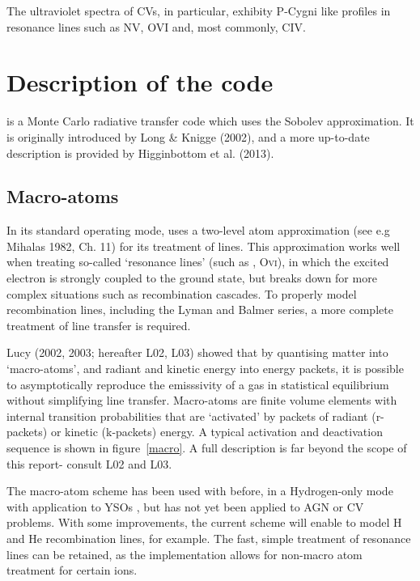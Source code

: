 \documentclass[usenatbib, a4paper]{mn2e}
\begin{document}
The ultraviolet spectra of CVs, in particular, exhibity P-Cygni like profiles in resonance lines such as 
NV, OVI and, most commonly, CIV.




%
%

\section{Description of the code}

\py is a Monte Carlo radiative transfer code which uses the Sobolev approximation. It is originally
introduced by Long \& Knigge (2002), and a more up-to-date description is provided by
Higginbottom et al. (2013). 


\subsection{Macro-atoms}
In its standard operating mode, \py uses a two-level atom approximation (see e.g Mihalas 1982\nocite{mihalas}, Ch. 11) for its treatment of lines. This approximation works well when treating so-called `resonance lines' (such as \civ, O\textsc{vi}), in which the excited electron is strongly coupled to the ground state, but breaks down for more complex situations such as recombination cascades. To properly model recombination lines, including the Lyman and Balmer series, a more complete treatment of line transfer is required.

Lucy (2002, 2003\nocite{lucy2002, lucy2003}; hereafter L02, L03) showed that by quantising matter into `macro-atoms', and radiant and kinetic energy into energy packets, it is possible to asymptotically reproduce the emisssivity of a gas in statistical equilibrium without simplifying line transfer. Macro-atoms are finite volume elements with internal transition probabilities that are `activated' by packets of radiant (r-packets) or kinetic (k-packets) energy. A typical activation and deactivation sequence is shown in figure~\ref{macro}.
A full description is far beyond the scope of this report- consult L02 and L03. 

The macro-atom scheme has been used with \py before, in a Hydrogen-only mode with application to YSOs \citep{simmacro2005}, but has not yet been applied to AGN or CV problems. With some improvements, the current scheme will enable \py to model H and He recombination lines, for example. The fast, simple treatment of resonance lines 
can be retained, as the \py implementation allows for non-macro atom treatment for certain ions.
\end{document}
